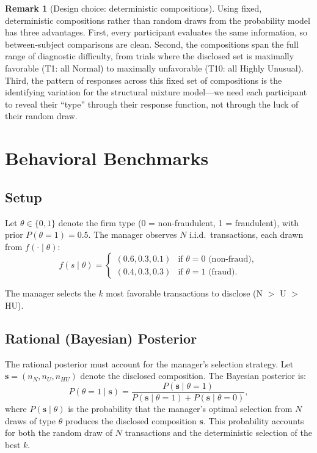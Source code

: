 \documentclass[12pt]{article}
\theoremstyle{definition}
\newtheorem{remark}{Remark}
\begin{document}
\begin{remark}[Design choice: deterministic compositions]
Using fixed, deterministic compositions rather than random draws from the probability model has three advantages. First, every participant evaluates the same information, so between-subject comparisons are clean. Second, the compositions span the full range of diagnostic difficulty, from trials where the disclosed set is maximally favorable (T1: all Normal) to maximally unfavorable (T10: all Highly Unusual). Third, the pattern of responses across this fixed set of compositions is the identifying variation for the structural mixture model---we need each participant to reveal their ``type'' through their response function, not through the luck of their random draw.
\end{remark}


\section{Behavioral Benchmarks}
\label{sec:benchmarks}

\subsection{Setup}

Let $\theta \in \{0, 1\}$ denote the firm type (0 = non-fraudulent, 1 = fraudulent), with prior $P(\theta = 1) = 0.5$. The manager observes $N$ i.i.d.\ transactions, each drawn from $f(\cdot \mid \theta)$:
\[
f(s \mid \theta) = \begin{cases}
(0.6, 0.3, 0.1) & \text{if } \theta = 0 \text{ (non-fraud)}, \\
(0.4, 0.3, 0.3) & \text{if } \theta = 1 \text{ (fraud)}.
\end{cases}
\]

The manager selects the $k$ most favorable transactions to disclose (N $>$ U $>$ HU).

\subsection{Rational (Bayesian) Posterior}

The rational posterior must account for the manager's selection strategy. Let $\mathbf{s} = (n_N, n_U, n_{HU})$ denote the disclosed composition. The Bayesian posterior is:
\begin{equation}
P(\theta = 1 \mid \mathbf{s}) = \frac{P(\mathbf{s} \mid \theta = 1)}{P(\mathbf{s} \mid \theta = 1) + P(\mathbf{s} \mid \theta = 0)},
\label{eq:posterior}
\end{equation}
where $P(\mathbf{s} \mid \theta)$ is the probability that the manager's optimal selection from $N$ draws of type $\theta$ produces the disclosed composition $\mathbf{s}$. This probability accounts for both the random draw of $N$ transactions and the deterministic selection of the best $k$.
\end{document}
